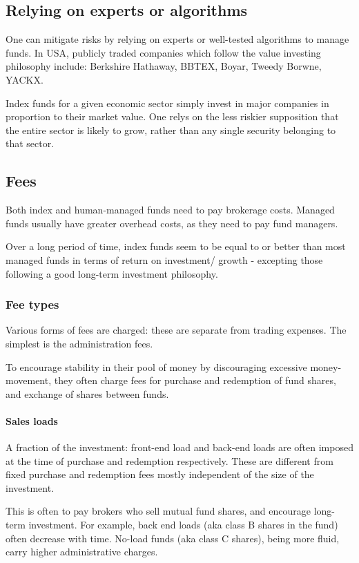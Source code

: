 \documentclass[oneside, article]{memoir}
\begin{document}
\subsection{Relying on experts or algorithms}
One can mitigate risks by relying on experts or well-tested algorithms to manage funds. In USA, publicly traded companies which follow the value investing philosophy include: Berkshire Hathaway, BBTEX, Boyar, Tweedy Borwne, YACKX.

Index funds for a given economic sector simply invest in major companies in proportion to their market value. One relys on the less riskier supposition that the entire sector is likely to grow, rather than any single security belonging to that sector.

\subsection{Fees}
Both index and human-managed funds need to pay brokerage costs. Managed funds usually have greater overhead costs, as they need to pay fund managers.

Over a long period of time, index funds seem to be equal to or better than most managed funds in terms of return on investment/ growth - excepting those following a good long-term investment philosophy.

\subsubsection{Fee types}
Various forms of fees are charged: these are separate from trading expenses. The simplest is the administration fees.

To encourage stability in their pool of money by discouraging excessive money-movement, they often charge fees for purchase and redemption of fund shares, and exchange of shares between funds.

\paragraph{Sales loads}
A fraction of the investment: front-end load and back-end loads are often imposed at the time of purchase and redemption respectively. These are different from fixed purchase and redemption fees mostly independent of the size of the investment.

This is often to pay brokers who sell mutual fund shares, and encourage long-term investment. For example, back end loads (aka class B shares in the fund) often decrease with time. No-load funds (aka class C shares), being more fluid, carry higher administrative charges.
\end{document}
